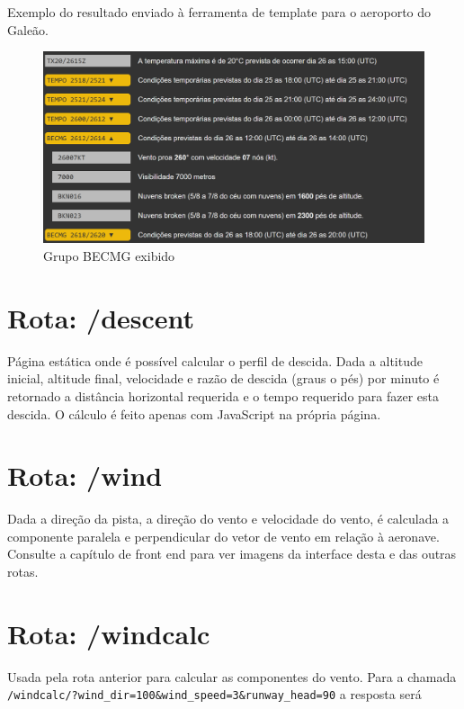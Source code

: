Exemplo do resultado enviado à ferramenta de template para o aeroporto do Galeão.




\begin{figure}[ht]
    \begin{center}
    \includegraphics[width=400pt]{img/BECMG-exibido.png}
    \caption{Grupo BECMG exibido}
    \label{fig:becmg-exibido}
    \end{center}
\end{figure}

\section{Rota: /descent}

Página estática onde é possível calcular o perfil de descida. Dada a altitude
inicial, altitude final, velocidade e razão de descida (graus o pés) por minuto
é retornado a distância horizontal requerida e o tempo requerido para fazer esta
descida. O cálculo é feito apenas com JavaScript na própria página.

\section{Rota: /wind}
Dada a direção da pista, a direção do vento e velocidade do vento, é calculada
a componente paralela e perpendicular do vetor de vento em relação à aeronave.
Consulte a capítulo de front end para ver imagens da interface desta e das outras
rotas.

\section{Rota: /windcalc}
Usada pela rota anterior para calcular as componentes do vento. Para a chamada
\verb|/windcalc/?wind_dir=100&wind_speed=3&runway_head=90| a resposta será

